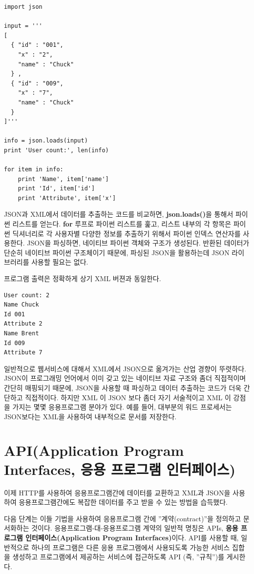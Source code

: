\beforeverb
\begin{verbatim}
import json

input = '''
[
  { "id" : "001",
    "x" : "2",
    "name" : "Chuck"
  } ,
  { "id" : "009",
    "x" : "7",
    "name" : "Chuck"
  } 
]'''

info = json.loads(input)
print 'User count:', len(info)

for item in info:
    print 'Name', item['name']
    print 'Id', item['id']
    print 'Attribute', item['x']
\end{verbatim}
\afterverb
%

JSON과 XML에서 데이터를 추출하는 코드를 비교하면, {\bf json.loads()}을 통해서 파이썬 리스트를 얻는다.
{\bf for} 루프로 파이썬 리스트를 훑고, 리스트 내부의 각 항목은 파이썬 딕셔너리로 각 사용자별 다양한 정보를 추출하기 위해서 파이썬 인덱스 연산자를 사용한다. 
JSON을 파싱하면, 네이티브 파이썬 객체와 구조가 생성된다.
반환된 데이터가 단순히 네이티브 파이썬 구조체이기 때문에, 파싱된 JSON을 활용하는데 JSON 라이브러리를 사용할 필요는 없다. 
 
프로그램 출력은 정확하게 상기 XML 버젼과 동일한다.

\beforeverb
\begin{verbatim}
User count: 2
Name Chuck
Id 001
Attribute 2
Name Brent
Id 009
Attribute 7
\end{verbatim}
\afterverb
%

일반적으로 웹서비스에 대해서 XML에서 JSON으로 옮겨가는 산업 경향이 뚜렷하다.
JSON이 프로그래밍 언어에서 이미 갖고 있는 네이티브 자료 구조와 좀더 직접적이며 간단히 매핑되기 때문에,
JSON을 사용할 때 파싱하고 데이터 추출하는 코드가 더욱 간단하고 직접적이다.
하지만 XML 이 JSON 보다 좀더 자기 서술적이고 XML 이 강점을 가지는 몇몇 응용프로그램 분야가 있다.
예를 들어, 대부분의 워드 프로세서는 JSON보다는 XML을 사용하여 내부적으로 문서를 저장한다. 

\section{API(Application Program Interfaces, 응용 프로그램 인터페이스)}

이제 HTTP를 사용하여 응용프로그램간에 데이터를 교환하고 XML과 JSON을 사용하여 응용프로그램간에도
복잡한 데이터를 주고 받을 수 있는 방법을 습득했다.

다음 단계는 이들 기법을 사용하여 응용프로그램 간에 ''계약(contract)''을 정의하고 문서화하는 것이다.
응용프로그램-대-응용프로그램 계약의 일반적 명칭은 APIs, {\bf 응용 프로그램 인터페이스(Application Program 
Interfaces)}이다. API를 사용할 때, 일반적으로 하나의 프로그램은 다른 응용 프로그램에서 사용되도록
가능한 서비스 집합을 생성하고 프로그램에서 제공하는 서비스에 접근하도록 API (즉, ''규칙'')를 게시한다.  

